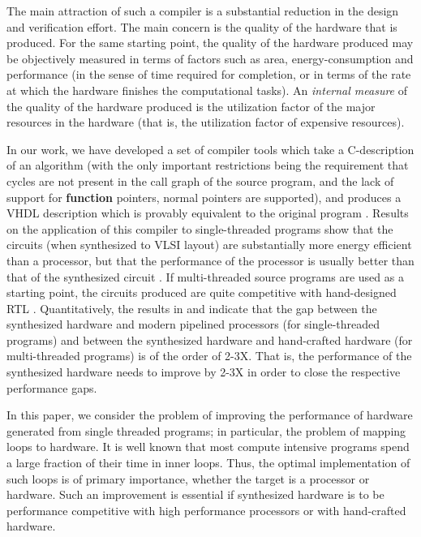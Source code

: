 \documentclass[conference]{IEEEtran}
\begin{document}
The main attraction of such a compiler is a substantial reduction in 
the design and verification effort.  The
main concern is the quality of the hardware that is produced.
For the same starting point, the quality of the hardware produced may be objectively
measured in terms of factors such as area, energy-consumption and performance (in the
sense of time required for completion, or in terms of the rate at which the hardware
finishes the computational tasks).  An {\em internal measure} of the quality of the
hardware produced is the utilization factor of the major resources in the hardware (that is,
the utilization factor of expensive resources).  

In our work, we have developed a set of compiler tools which take a C-description of
an algorithm (with the only important restrictions being the requirement that
cycles are not present in the call graph of the source program, and the lack of 
support for {\bf function} pointers, normal pointers are supported), and produces
a VHDL description which is provably equivalent to the original program \cite{SameerPhD}.
Results on the application of this compiler to single-threaded programs show
that the circuits (when synthesized to VLSI layout) are substantially more
energy efficient than a processor, but that the performance of the processor
is usually better than that of the synthesized circuit \cite{dsd2010}.
If multi-threaded source programs are used as a starting point, the circuits produced 
are quite competitive with hand-designed RTL \cite{usenix2012}.
Quantitatively, the results in \cite{dsd2010} and \cite{usenix2012} indicate
that the gap between the synthesized hardware and modern
pipelined processors (for single-threaded
programs) and between the synthesized hardware and hand-crafted hardware (for
multi-threaded programs) is of the order of 2-3X.  That is, the performance
of the synthesized hardware needs to improve by 2-3X in order to close
the respective performance gaps.

In this paper, we consider the problem of improving the performance
of hardware generated from single threaded programs; in
particular, the problem of mapping loops to hardware.  It
is well known that most compute intensive programs spend a large fraction
of their time in inner loops.  Thus, the optimal implementation
of such loops is of primary importance, whether the target is
a processor or hardware.  Such an improvement is essential if
synthesized hardware is to be performance competitive with
high performance processors or with hand-crafted hardware.
\end{document}
